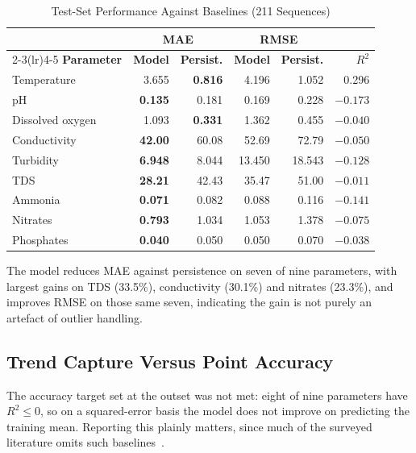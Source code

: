 \documentclass[conference]{IEEEtran}
\begin{document}
\begin{table}[!t]
\caption{Test-Set Performance Against Baselines (211 Sequences)}
\label{tab:results}
\centering
\small
\setlength{\tabcolsep}{3.5pt}
\begin{tabular}{lrrrrr}
\toprule
& \multicolumn{2}{c}{\textbf{MAE}} & \multicolumn{2}{c}{\textbf{RMSE}} & \\
\cmidrule(lr){2-3}\cmidrule(lr){4-5}
\textbf{Parameter} & \textbf{Model} & \textbf{Persist.} & \textbf{Model} & \textbf{Persist.} & \textbf{$R^2$} \\
\midrule
Temperature      & 3.655 & \textbf{0.816} & 4.196 & 1.052 & 0.296 \\
pH               & \textbf{0.135} & 0.181 & 0.169 & 0.228 & $-0.173$ \\
Dissolved oxygen & 1.093 & \textbf{0.331} & 1.362 & 0.455 & $-0.040$ \\
Conductivity     & \textbf{42.00} & 60.08 & 52.69 & 72.79 & $-0.050$ \\
Turbidity        & \textbf{6.948} & 8.044 & 13.450 & 18.543 & $-0.128$ \\
TDS              & \textbf{28.21} & 42.43 & 35.47 & 51.00 & $-0.011$ \\
Ammonia          & \textbf{0.071} & 0.082 & 0.088 & 0.116 & $-0.141$ \\
Nitrates         & \textbf{0.793} & 1.034 & 1.053 & 1.378 & $-0.075$ \\
Phosphates       & \textbf{0.040} & 0.050 & 0.050 & 0.070 & $-0.038$ \\
\bottomrule
\end{tabular}
\end{table}

The model reduces MAE against persistence on seven of nine parameters, with
largest gains on TDS (33.5\%), conductivity (30.1\%) and nitrates (23.3\%), and
improves RMSE on those same seven, indicating the gain is not purely an
artefact of outlier handling.

\subsection{Trend Capture Versus Point Accuracy}

The accuracy target set at the outset was not met: eight of nine parameters
have $R^2 \leq 0$, so on a squared-error basis the model does not improve on
predicting the training mean. Reporting this plainly matters, since much of the
surveyed literature omits such baselines~\cite{pandya,rahu}.
\end{document}

